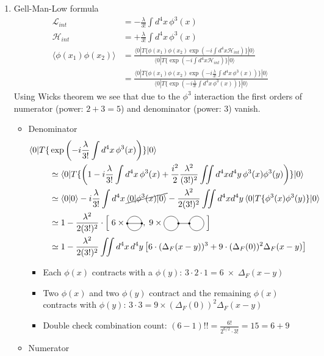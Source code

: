 \documentclass[10pt,a4paper]{article}
\theoremstyle{definition}
\newcommand{\feynTwoLoops}{
  \raisebox{0.2em}{%
    \begin{tikzpicture}[scale=0.3, baseline]
      \coordinate (A) at (-1,0);
      \coordinate (B) at (+0.5,0);
      \draw (-2,0) circle (1.0);
      \draw (A) -- (B);
      \draw (+1.5,0) circle (1.0);
	  \filldraw (A) circle (3.5pt);
      \filldraw (B) circle (3.5pt);
    \end{tikzpicture}%
  }
}
\newcommand{\feynOneLoopConnect}{
  \raisebox{0.2em}{%
    \begin{tikzpicture}[scale=0.3, baseline]

      \coordinate (B) at (-1,0);
      \coordinate (C) at (1,0);
      \draw (B) -- (C);
      \draw (0,0) circle (1.0);
      \filldraw (B) circle (3.5pt);
      \filldraw (C) circle (3.5pt);
    \end{tikzpicture}%
  }
}
\begin{document}
\begin{enumerate}[1.]
\item Gell-Man-Low formula
\begin{align}
\mathcal{L}_{int}&=-\frac{\lambda}{3!}\int d^4x\,\phi^3(x)\\
\mathcal{H}_{int}&=+\frac{\lambda}{3!}\int d^4x\,\phi^3(x)\\
\langle\phi(x_1)\phi(x_2)\rangle
&=\frac{\langle0| T\{\phi(x_1)\phi(x_2)\exp(-i\int d^4x\mathcal{H}_{int})\}|0\rangle}{\langle0| T\{\exp(-i\int d^4x\mathcal{H}_{int})\}|0\rangle}\\
&=\frac{\langle0| T\{\phi(x_1)\phi(x_2)\exp(-i\frac{\lambda}{3!}\int d^4x\,\phi^3(x))\}|0\rangle}{\langle0| T\{\exp(-i\frac{\lambda}{3!}\int d^4x\,\phi^3(x))\}|0\rangle}
\end{align}
Using Wicks theorem we see that due to the $\phi^3$ interaction the first orders of numerator (power: $2+3=5$) and denominator (power: 3) vanish.
\begin{itemize}
\item Denominator
\begin{align}
\langle0| T\{&\exp\left(-i\frac{\lambda}{3!}\int d^4x\,\phi^3(x)\right)\}|0\rangle\\
&\simeq\langle0| T\{\left(1-i\frac{\lambda}{3!}\int d^4x\,\phi^3(x)+\frac{i^2}{2}\frac{\lambda^2}{(3!)^2}\iint d^4xd^4y\,\phi^3(x)\phi^3(y)\right)\}|0\rangle\\
&\simeq\langle0| 0\rangle
-i\frac{\lambda}{3!}\int d^4x\, \cancel{\langle0|\phi^3(x)|0\rangle}
-\frac{\lambda^2}{2(3!)^2}\iint d^4xd^4y\, \langle0| T\{\phi^3(x)\phi^3(y)\}|0\rangle\\
&\simeq 1 - \frac{\lambda^2}{2(3!)^2}\cdot \left[\;6\times\feynOneLoopConnect,\;9\times\feynTwoLoops\;\right]\\
&\simeq 1 - \frac{\lambda^2}{2(3!)^2}\iint d^4x\,d^4y \left[6\cdot(\Delta_F(x-y))^3+9\cdot(\Delta_F(0))^2\Delta_F(x-y)\right]
\end{align}
\begin{itemize}
\item Each $\phi(x)$ contracts with a $\phi(y)$: $3\cdot2\cdot1=6\;\times\;\Delta_F(x-y)$
\item Two $\phi(x)$ and two $\phi(y)$ contract and the remaining $\phi(x)$ contracts with $\phi(y)$: $3\cdot3=9 \times (\Delta_F(0))^2\Delta_F(x-y)$
\item Double check combination count: $(6-1)!!=\frac{6!}{2^{6/2}\cdot3!}=15=6+9$
\end{itemize}
\item Numerator

\end{itemize}
\end{enumerate}
\end{document}
